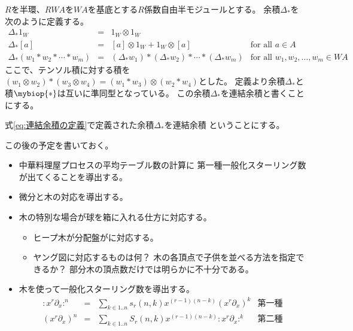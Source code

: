 	$R$を半環、$RWA$を$WA$を基底とする$R$係数自由半モジュールとする。
	余積$\Delta_*$を次のように定義する。
	\begin{equation}\label{eq:連結余積の定義}\begin{array}{rcll} %
		\Delta_*1_W &=& 1_W\otimes1_W \\
		\Delta_*[a] &=& [a]\otimes1_W+1_W\otimes[a] & \text{for all }a\in A \\
		\Delta_*(w_1*w_2*\cdots*w_m) &=& (\Delta_*w_1)*(\Delta_*w_2)*\cdots
			*(\Delta_*w_m) & \text{for all }w_1,w_2,\dots,w_m\in WA
	\end{array}\end{equation} %
	ここで、テンソル積に対する積を
	$(w_1\otimes w_2)*(w_3\otimes w_4)=(w_1*w_3)\otimes(w_2*w_4)$とした。
	定義より余積$\Delta_*$と積$\mybiop{*}$は互いに準同型となっている。
	この余積$\Delta_*$を連結余積と書くことにする。

	\begin{definition}[連結余積]\label{def:連結余積} %
		式\eqref{eq:連結余積の定義}で定義された余積$\Delta_*$を連結余積
		ということにする。
	\end{definition} %

\begin{todo}[この後]\label{todo:この後} %
\begingroup
	\providecommand{\xdx}[2]{{#1}{#2}\partial_{#1}}
	この後の予定を書いておく。
	\begin{itemize}\setlength{\itemsep}{-1mm} %
		\item 中華料理屋プロセスの平均テーブル数の計算に
		第一種一般化スターリング数が出てくることを導出する。
		\item 微分と木の対応を導出する。
		\item 木の特別な場合が球を箱に入れる仕方に対応する。
		\begin{itemize}\setlength{\itemsep}{-1mm} %
			\item ヒープ木が分配盤がに対応する。
			\item ヤング図に対応するものは何？
			木の各頂点で子供を並べる方法を指定できるか？
			部分木の頂点数だけでは明らかに不十分である。
		\end{itemize} %
		\item 木を使って一般化スターリング数を導出する。
		\begin{equation*}\begin{array}{rcll} %
			:x^r\partial_x:^n &=& \sum_{k\in1..n}s_r(n,k)x^{(r-1)(n-k)}
				(x^r\partial_x)^k & \text{第一種} \\
			(x^r\partial_x)^n &=& \sum_{k\in1..n}S_r(n,k)x^{(r-1)(n-k)}:x^r\partial_x:^k
				& \text{第二種} \\
		\end{array}\end{equation*} %
	\end{itemize} %
\endgroup
\end{todo} %


